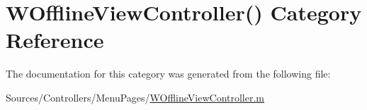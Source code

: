 \hypertarget{category_w_offline_view_controller_07_08}{\section{W\-Offline\-View\-Controller() Category Reference}
\label{category_w_offline_view_controller_07_08}
}


The documentation for this category was generated from the following file\-:\begin{DoxyCompactItemize}
\item 
Sources/\-Controllers/\-Menu\-Pages/\hyperlink{_w_offline_view_controller_8m}{W\-Offline\-View\-Controller.\-m}\end{DoxyCompactItemize}
